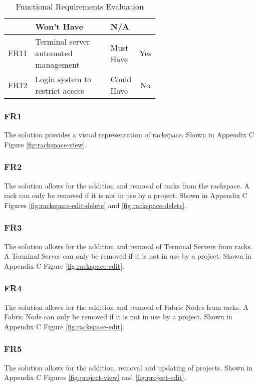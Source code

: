 \begin{center}
\begin{table}[H]
\begin{tabular}{l p{0.6\linewidth} l c}
                        & Won’t Have
                        & \cellcolor{red!25}N/A
            \\
            \hline
            FR11        & Terminal server automated management
                        & Must Have
                        & \cellcolor{green!25}Yes
            \\ \hline
            FR12        & Login system to restrict access                   &
            Could Have
                        & \cellcolor{red!25}No
            \\
        \end{tabular}
        \caption{Functional Requirements Evaluation}
        \label{table:evaluation-functional-requirements}
    \end{table}
\end{center}

\subsubsection{FR1}
The solution provides a visual representation of rackspace. Shown in Appendix C Figure \ref{fig:rackspace-view}.

\subsubsection{FR2}
The solution allows for the addition and removal of racks from the rackspace. A rack can only be removed if it is not in use by a project. Shown in Appendix C Figures \ref{fig:rackspace-edit-delete} and \ref{fig:rackspace-delete}.

\subsubsection{FR3}
The solution allows for the addition and removal of Terminal Servers from racks. A Terminal Server can only be removed if it is not in use by a project. Shown in Appendix C Figure \ref{fig:rackspace-edit}.

\subsubsection{FR4}
The solution allows for the addition and removal of Fabric Nodes from racks. A Fabric Node can only be removed if it is not in use by a project. Shown in Appendix C Figure \ref{fig:rackspace-edit}.

\subsubsection{FR5}
The solution allows for the addition, removal and updating of projects. Shown in Appendix C Figures \ref{fig:project-view} and \ref{fig:project-edit}.

